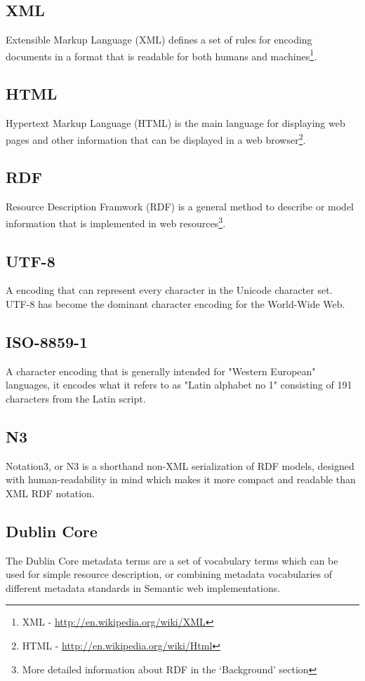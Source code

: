 \documentclass[a4paper,11pt]{kth-mag}
\begin{document}
\subsection*{XML} Extensible Markup Language (XML) defines a set of rules for
encoding documents in a format that is readable for both humans and
machines\footnote{XML - \url{http://en.wikipedia.org/wiki/XML}}.

\subsection*{HTML} Hypertext Markup Language (HTML) is the main language for
displaying web pages and other information that can be displayed in a web
browser\footnote{HTML - \url{http://en.wikipedia.org/wiki/Html}}.

\subsection*{RDF} Resource Description Framwork (RDF) is a general method to
describe or model information that is implemented in web
resources\footnote{More detailed information about RDF in the ‘Background’
section}.

\subsection*{UTF-8} A encoding that can represent every character in the
Unicode character set. UTF-8 has become the dominant character encoding for
the World-Wide Web.

\subsection*{ISO-8859-1} A character encoding that is generally intended for
"Western European" languages, it encodes what it refers to as "Latin alphabet
no 1" consisting of 191 characters from the Latin script.

\subsection*{N3}
Notation3, or N3 is a shorthand non-XML serialization of RDF models,
designed with human-readability in mind which makes it more compact and
readable than XML RDF notation.

\subsection*{Dublin Core}
The Dublin Core metadata terms are a set of vocabulary terms which
can be used for simple resource description, or combining metadata
vocabularies of different metadata standards in Semantic web implementations.
\end{document}
